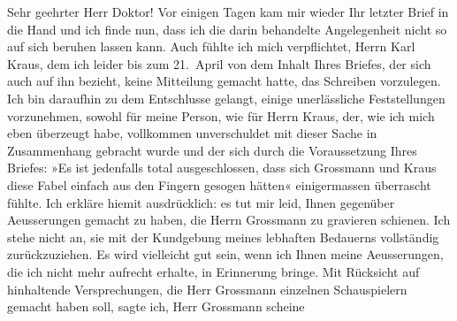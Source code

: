 \begin{ledgroupsized}[t]{13cm}
           \pstart{}Sehr geehrter Herr Doktor!\pend\pstart
           Vor einigen Tagen kam mir wieder Ihr letzter Brief in die Hand und ich finde nun,
               dass ich die darin behandelte Angelegenheit nicht so auf sich beruhen lassen kann.
               Auch fühlte ich mich verpflichtet, Herrn Karl
                  Kraus, dem ich leider bis zum 21. April von dem Inhalt Ihres
               Briefes, der sich auch auf ihn bezieht, keine Mitteilung gemacht hatte, das Schreiben
               vorzulegen. Ich bin daraufhin zu dem Entschlusse gelangt, einige unerlässliche
               Feststellungen vorzunehmen, sowohl für meine Person, wie für Herrn Kraus, der, wie ich mich eben überzeugt habe,
               vollkommen unverschuldet mit dieser Sache in Zusammenhang gebracht wurde und der sich
               durch die Voraussetzung Ihres Briefes: »Es ist jedenfalls total ausgeschlossen, dass
               sich Grossmann und Kraus diese Fabel einfach aus den Fingern gesogen hätten«
               einigermassen überrascht fühlte.\pend
           \pstart
           Ich erkläre hiemit ausdrücklich: es tut mir leid, Ihnen gegenüber Aeusserungen
               gemacht zu haben, die Herrn Grossmann zu
               gravieren schienen. Ich stehe nicht an, sie mit der Kundgebung meines lebhaften
               Bedauerns vollständig zurückzuziehen. Es wird vielleicht gut sein, wenn ich Ihnen
               meine Aeusserungen, die ich nicht mehr aufrecht erhalte, in Erinnerung bringe. Mit
               Rücksicht auf hinhaltende Versprechungen, die Herr Grossmann einzelnen {\pb}Schauspielern gemacht
               haben soll, sagte ich, Herr Grossmann scheine

\end{ledgroupsized}
